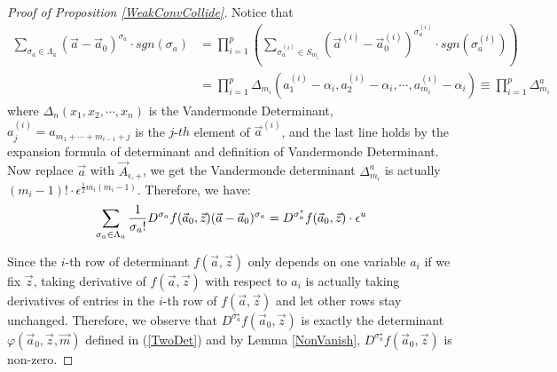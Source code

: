 \begin{proof}[Proof of Proposition \ref{WeakConvCollide}]
Notice that 
\begin{align*}
	\sum_{\sigma_{a}\in\Lambda_{a}}(\vec{a}-\vec{a}_{0})^{\sigma_{a}}\cdot sgn(\sigma_{a})&=\prod_{i=1}^{p}\left(\sum_{\sigma_{a}^{(i)}\in S_{m_i}}(\vec{a}^{(i)}-\vec{a}_{0}^{(i)})^{\sigma_{a}^{(i)}}\cdot sgn(\sigma_{a}^{(i)})\right)\\
	&=\prod_{i=1}^{p}\Delta_{m_i}(a_{1}^{(i)}-\alpha_{i},a_{2}^{(i)}-\alpha_{i},\cdots,a_{m_i}^{(i)}-\alpha_{i})\equiv\prod_{i=1}^{p}\Delta_{m_i}^{a}
\end{align*}
where $\Delta_{n}(x_{1},x_{2},\cdots,x_{n})$ is the Vandermonde Determinant, $a_{j}^{(i)}=a_{m_{1}+\cdots+m_{i-1}+j}$ is the $j$-$th$ element of $\vec{a}^{(i)}$, and the last line holds by the expansion formula of determinant and definition of Vandermonde Determinant. Now replace $\vec{a}$ with $\vec{A}_{\epsilon,+}$, we get the Vandermonde determinant $\Delta_{m_{i}}^{a}$ is actually $(m_{i}-1)!\cdot\epsilon^{\frac{1}{2}m_{i}(m_{i}-1)}$. Therefore, we have: 
\begin{equation}{\label{FirstTerm}}
	\sum_{\sigma_{a}\in\Lambda_{a}}\frac{1}{\sigma_{a}!}D^{\sigma_{a}}f(\vec{a}_{0},\vec{z})(\vec{a}-\vec{a}_{0})^{\sigma_{a}}=D^{\sigma_{a}^{\star}}f(\vec{a}_{0},\vec{z})\cdot\epsilon^{u}
\end{equation}

Since the $i$-th row of determinant $f(\vec{a},\vec{z})$ only depends on one variable $a_{i}$ if we fix $\vec{z}$, taking derivative of $f(\vec{a},\vec{z})$ with respect to $a_i$ is actually taking derivatives of entries in the $i$-th row of $f(\vec{a},\vec{z})$ and let other rows stay unchanged. Therefore, we observe that $D^{\sigma_{a}^{\star}}f(\vec{a}_0,\vec{z})$ is exactly the determinant $\varphi(\vec{a}_{0},\vec{z},\vec{m})$ defined in (\ref{TwoDet}) and by Lemma \ref{NonVanish}, $D^{\sigma_{a}^{\star}}f(\vec{a}_{0},\vec{z})$ is non-zero.


\end{proof}

